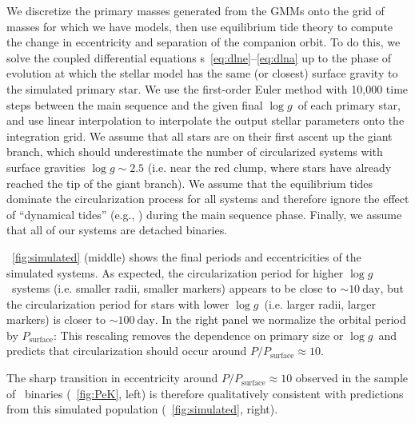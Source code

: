 \documentclass[modern, letterpaper]{aastex62}
\newcommand{\apogee}{\project{\acronym{APOGEE}}}
\newcommand{\logg}{\ensuremath{\log g}}
\newcommand{\Psurf}{\ensuremath{P_\textrm{surface}}}
\begin{document}
We discretize the primary masses generated from the GMMs onto the grid of masses
for which we have  models, then use equilibrium tide theory to
compute the change in eccentricity and separation of the companion orbit.
To do this, we solve the coupled differential equations \eqname
s~\ref{eq:dlne}--\ref{eq:dlna} up to the phase of evolution at which the stellar
model has the same (or closest) surface gravity to the simulated primary star.
We use the first-order Euler method with 10,000 time steps between the main
sequence and the given final \logg\ of each primary star, and use linear
interpolation to interpolate the  output stellar parameters onto
the integration grid.
We assume that all stars are on their first ascent up the giant branch, which
should underestimate the number of circularized systems with surface gravities
$\logg \sim 2.5$ (i.e. near the red clump, where stars have already reached the
tip of the giant branch).
We assume that the equilibrium tides dominate the circularization process for
all systems and therefore ignore the effect of ``dynamical tides''
(e.g., \citealt{Goodman:1998}) during the main sequence phase.
Finally, we assume that all of our systems are detached binaries.

\figurename~\ref{fig:simulated} (middle) shows the final periods and
eccentricities of the simulated systems.
As expected, the circularization period for higher \logg\ systems (i.e. smaller
radii, smaller markers) appears to be close to $\sim 10~\textrm{day}$, but the
circularization period for stars with lower \logg\ (i.e. larger radii, larger
markers) is closer to $\sim 100~\textrm{day}$.
In the right panel we normalize the orbital period by \Psurf:
This rescaling removes the dependence on primary size or \logg\ and predicts
that circularization should occur around $P / \Psurf \approx 10$.

The sharp transition in eccentricity around $P/\Psurf \approx 10$ observed in
the sample of \apogee\ binaries (\figurename~\ref{fig:PeK}, left) is therefore
qualitatively consistent with predictions from this simulated population
(\figurename~\ref{fig:simulated}, right).
\end{document}
